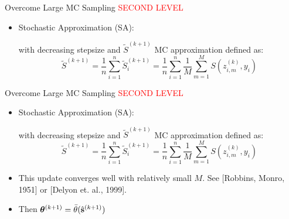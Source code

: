 \documentclass[10pt]{beamer}
\begin{document}
\begin{frame}{Overcome Large MC Sampling}
\textcolor{red}{SECOND LEVEL}
\begin{itemize}
\item Stochastic Approximation (SA):
\begin{center}
\end{center}
with decreasing stepsize and $\tilde{S}^{(k+1)}$ MC approximation defined as:
$$
\tilde{S}^{(k+1)} = \frac{1}{n} \sum_{i=1}^n \tilde{S}^{(k+1)}_i = \frac{1}{n} \sum_{i=1}^n\frac{1}{M} \sum_{m=1}^M S(z_{i,m}^{(k)}, y_i)
$$
\end{itemize}

\end{frame}

     
\begin{frame}{Overcome Large MC Sampling}
\textcolor{red}{SECOND LEVEL}
\begin{itemize}
\item Stochastic Approximation (SA):
\begin{center}
\end{center}
with decreasing stepsize and $\tilde{S}^{(k+1)}$ MC approximation defined as:
$$
\tilde{S}^{(k+1)} = \frac{1}{n} \sum_{i=1}^n \tilde{S}^{(k+1)}_i = \frac{1}{n} \sum_{i=1}^n\frac{1}{M} \sum_{m=1}^M S(z_{i,m}^{(k)}, y_i)
$$
\item This update converges well with relatively small $M$. See [Robbins, Monro, 1951] or [Delyon et. al., 1999].
\item Then ${\bm{\theta}}^{(k+1)} = \bar{\theta}(\hat{{\mathbf{s}}}^{(k+1)})$
\end{itemize}

\end{frame}
\end{document}
